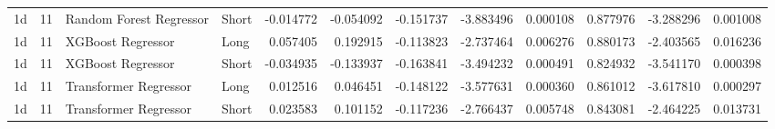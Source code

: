 \begin{tabular}{llllrrrrrrrr}
1d & 11 & Random Forest Regressor & Short & -0.014772 & -0.054092 & -0.151737 & -3.883496 & 0.000108 & 0.877976 & -3.288296 & 0.001008 \\
1d & 11 & XGBoost Regressor & Long & 0.057405 & 0.192915 & -0.113823 & -2.737464 & 0.006276 & 0.880173 & -2.403565 & 0.016236 \\
1d & 11 & XGBoost Regressor & Short & -0.034935 & -0.133937 & -0.163841 & -3.494232 & 0.000491 & 0.824932 & -3.541170 & 0.000398 \\
1d & 11 & Transformer Regressor & Long & 0.012516 & 0.046451 & -0.148122 & -3.577631 & 0.000360 & 0.861012 & -3.617810 & 0.000297 \\
1d & 11 & Transformer Regressor & Short & 0.023583 & 0.101152 & -0.117236 & -2.766437 & 0.005748 & 0.843081 & -2.464225 & 0.013731 \\
\bottomrule
\end{tabular}
